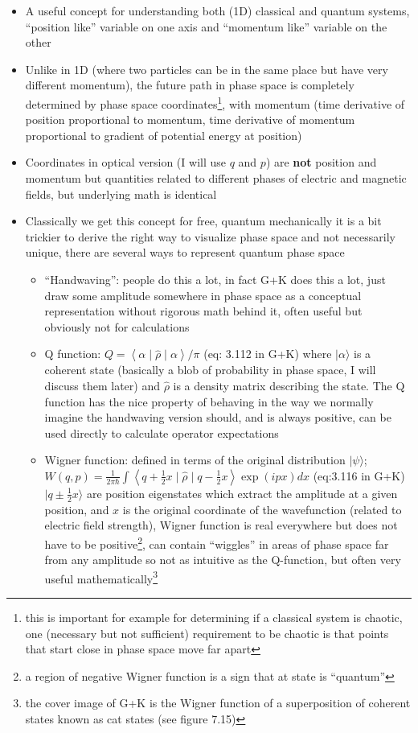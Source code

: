 \documentclass[english]{article}
\newcommand{\ket}[1]{|#1 \rangle}
\newcommand{\sandwich}[3]{\left \langle #1 \mid #2 \mid #3 \right\rangle}
\begin{document}
\begin{itemize}
\item A useful concept for understanding both (1D) classical and quantum systems, ``position like'' variable on one axis and ``momentum like'' variable on the other
\item Unlike in 1D (where two particles can be in the same place but have very different momentum), the future path in phase space is completely determined by phase space coordinates\footnote{this is important for example for determining if a classical system is chaotic, one (necessary but not sufficient) requirement to be chaotic is that points that start close in phase space move far apart}, with momentum (time derivative of position proportional to momentum, time derivative of momentum proportional to gradient of potential energy at position)
\item Coordinates in optical version (I will use $q$ and $p$) are \textbf{not} position and momentum but quantities related to different phases of electric and magnetic fields, but underlying math is identical
\item Classically we get this concept for free, quantum mechanically it is a bit trickier to derive the right way to visualize phase space and not necessarily unique, there are several ways to represent quantum phase space
\begin{itemize}
\item ``Handwaving'': people do this a lot, in fact G+K does this a lot, just draw some amplitude somewhere in phase space as a conceptual representation without rigorous math behind it, often useful but obviously not for calculations
\item Q function: $Q=\sandwich{\alpha}{\hat{\rho}}{\alpha}/\pi$ (eq: 3.112 in G+K) where $\ket{\alpha}$ is a coherent state (basically a blob of probability in phase space, I will discuss them later) and  $\hat{\rho}$ is a density matrix describing the state. The Q function has the nice property of behaving in the way we normally imagine the handwaving version should, and is always positive, can be used directly to calculate operator expectations
\item Wigner function: defined in terms of the original distribution $\ket{\psi}$; $W(q,p)=\frac{1}{2 \pi \hbar}\int \sandwich{q+\frac{1}{2}x}{\hat{\rho}}{q-\frac{1}{2}x}\exp(ipx)dx$ (eq:3.116 in G+K) $\ket{q\pm\frac{1}{2}x}$ are position eigenstates which extract the amplitude at a given position, and $x$ is the original coordinate of the wavefunction (related to electric field strength), Wigner function is real everywhere but does not have to be positive\footnote{a region of negative Wigner function is a sign that at state is ``quantum''}, can contain ``wiggles'' in areas of phase space far from any amplitude so not as intuitive as the Q-function, but often very useful mathematically\footnote{the cover image of G+K is the Wigner function of a superposition of coherent states known as cat states (see figure  7.15)}
\end{itemize}
\end{itemize}
\end{document}
